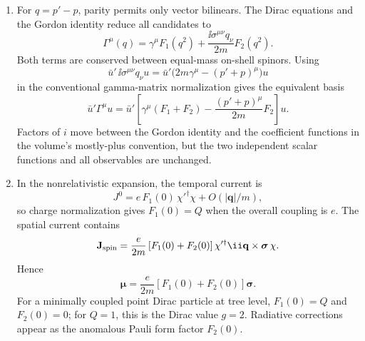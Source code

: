 \begin{enumerate}
\begin{enumerate}
\item
For \(q=p'-p\), parity permits only vector bilinears.  The Dirac equations
and the Gordon identity reduce all candidates to
\[
 \boxed{\;
 \Gamma^\mu(q)=
 \gamma^\mu F_1(q^2)
 +\frac{\ii\sigma^{\mu\nu}q_\nu}{2m}F_2(q^2).\;}
\]
Both terms are conserved between equal-mass on-shell spinors.  Using
\[
 \bar u'\,\ii\sigma^{\mu\nu}q_\nu u
 =\bar u'\bigl(2m\gamma^\mu-(p'+p)^\mu\bigr)u
\]
in the conventional gamma-matrix normalization gives the equivalent basis
\[
 \bar u'\Gamma^\mu u
 =\bar u'\left[
 \gamma^\mu(F_1+F_2)
 -\frac{(p'+p)^\mu}{2m}F_2
 \right]u.
\]
Factors of \(i\) move between the Gordon identity and the coefficient
functions in the volume's mostly-plus convention, but the two independent
scalar functions and all observables are unchanged.
\item
In the nonrelativistic expansion, the temporal current is
\[
 J^0=e\,F_1(0)\,\chi'^\dagger\chi+O(|\mathbf q|/m),
\]
so charge normalization gives \(F_1(0)=Q\) when the overall coupling is
\(e\).  The spatial current contains
\[
 \mathbf J_{\rm spin}
 =\frac{e}{2m}\,[F_1(0)+F_2(0)]\,
 \chi'^\dagger \ii\mathbf q\times\boldsymbol\sigma\,\chi .
\]
Hence
\[
 \boxed{\boldsymbol\mu
 =\frac{e}{2m}[F_1(0)+F_2(0)]\boldsymbol\sigma.}
\]
For a minimally coupled point Dirac particle at tree level,
\(F_1(0)=Q\) and \(F_2(0)=0\); for \(Q=1\), this is the Dirac value
\(g=2\).  Radiative corrections appear as the anomalous Pauli form factor
\(F_2(0)\).
\end{enumerate}


\end{enumerate}
